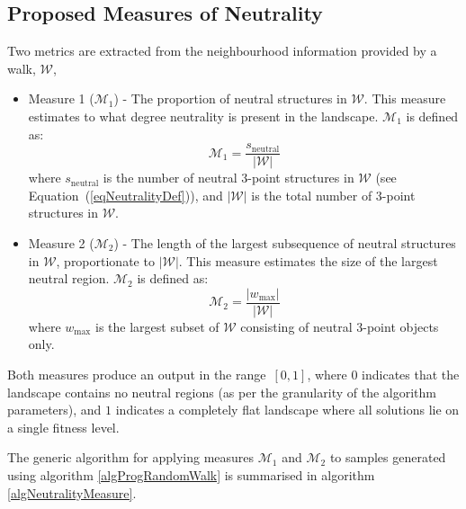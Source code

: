 \documentclass[conference]{IEEEtran}
\begin{document}
\subsection{Proposed Measures of Neutrality}
\label{neutralityMetrics}
Two metrics are extracted from the neighbourhood information provided by a walk, $\mathcal{W}$,
\begin{itemize}
	\item Measure 1 (${\mathcal{M}_1}$) - The proportion of neutral structures in $\mathcal{W}$. This measure estimates to what degree neutrality is present in the landscape. ${\mathcal{M}_1}$ is defined as:
          \begin{equation}
            \label{eqNeutralityM1}
	    {\mathcal{M}_1} = \frac{s_{\text{neutral}}}{\lvert \mathcal{W} \rvert}
          \end{equation}
where $s_{\text{neutral}}$ is the number of neutral 3-point structures in $\mathcal{W}$ (see Equation~(\ref{eqNeutralityDef})), and $\lvert \mathcal{W} \rvert$ is the total number of 3-point structures in $\mathcal{W}$.
	\item Measure 2 (${\mathcal{M}_2}$) - The length of the largest subsequence of neutral structures in $\mathcal{W}$, proportionate to $\lvert \mathcal{W} \rvert$. This measure estimates the size of the largest neutral region. ${\mathcal{M}_2}$ is defined as:
          \begin{equation}
            \label{eqNeutralityM2}
	    {\mathcal{M}_2} = \frac{\lvert w_{\text{max}} \rvert}{\lvert \mathcal{W} \rvert}
          \end{equation}
where $w_{\text{max}}$ is the largest subset of $\mathcal{W}$ consisting of neutral 3-point objects only.
\end{itemize}

Both measures produce an output in the range~$[0,1]$, where $0$ indicates that the landscape contains no neutral regions (as per the granularity of the algorithm parameters), and $1$ indicates a completely flat landscape where all solutions lie on a single fitness level.

The generic algorithm for applying measures ${\mathcal{M}_1}$ and ${\mathcal{M}_2}$ to samples generated using algorithm \ref{algProgRandomWalk} is summarised in algorithm \ref{algNeutralityMeasure}.
\end{document}
